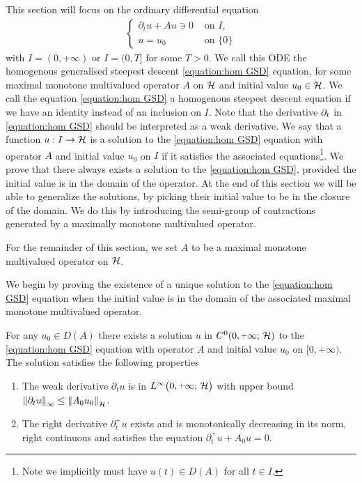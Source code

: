 This section will focus on the ordinary differential equation
\begin{align}\label{equation:hom GSD}\tag{hGSD}
	\begin{cases}
		\partial_t u+Au \ni 0 & \text{ on }I,\\
		u=u_0 & \text{ on }\{0\}
	\end{cases}
\end{align}
with $ I=(0,\plus\infty) $ or $ I=(0,T] $ for some $ T>0 $.
We call this ODE the homogenous generalised 
steepest descent \ref{equation:hom GSD} equation, for 
some maximal monotone multivalued operator $ A $
on $ \mathcal{H} $ and initial value $ u_0\in\mathcal{H} $. We call the
equation \ref{equation:hom GSD} a homogenous 
steepest descent equation if we have an identity instead of an inclusion
on $ I $.
Note that the derivative $ \partial_t $ in \ref{equation:hom GSD} should be
interpreted as a weak derivative. We say that a 
function $ u:I\rightarrow\mathcal{H} $ is a solution to the 
\ref{equation:hom GSD} equation with operator $ A $
and initial value $ u_0 $ on $ I $ if it satisfies the 
associated equations\footnote{Note we implicitly must have $ u(t)\in D(A) $
for all $ t\in I $.}. We prove that there always
exists a solution to the \ref{equation:hom GSD}, provided
the initial value is in the domain of the operator. 
At the end of this section we will be able to generalize
the solutions, by picking their initial value 
to be in the closure of the domain. We do this by introducing
the semi-group of contractions generated by a maximally 
monotone multivalued operator.\medskip

For the remainder of this section, we set $ A $ to 
be a maximal monotone multivalued operator on $ \mathcal{H} $.\medskip

We begin by proving the existence of a unique solution to
the \ref{equation:hom GSD} equation when the
initial value is in the domain of the associated maximal
monotone multivalued operator.

\begin{theorem}\label{theorem:existence of hom gf}
	For any $u_0\in D(A)$ there exists a solution $ u $
	in $ C^0(0,\plus\infty;\,\rH) $ to the 
	\ref{equation:hom GSD} equation with operator $ A $
	and initial value $ u_0 $ on $ [0,\plus\infty) $.
	The solution satisfies the following properties
	\begin{enumerate}[label=(\roman*)]
		\item The weak derivative $ \partial_t u $ is in $ \linfnn $ with upper
		bound $\left\Vert \partial_t u\right\Vert_{\infty}\leq\left\Vert A_0 u_0\right\Vert_{\mathcal{H}}$.
		\item The right derivative $ \partial_t^+ u $ exists and 
		is monotonically decreasing in its norm,
		right continuous and satisfies 
		the equation $\partial_t^+ u+A_0 u = 0$.
	\end{enumerate}
\end{theorem}

